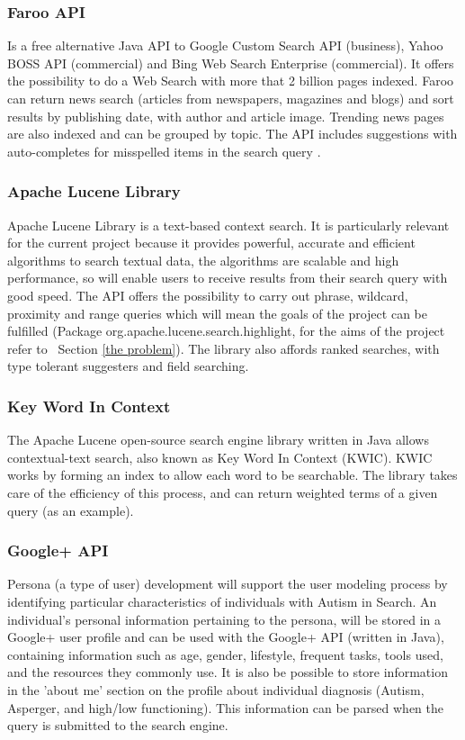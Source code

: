 \documentclass[10pt]{article}
\begin{document}
\subsubsection{Faroo API}
Is a free alternative Java API to Google Custom Search API (business), Yahoo BOSS API  (commercial) and Bing Web Search Enterprise (commercial). It offers the possibility to do a Web Search with more that 2 billion pages indexed. Faroo can return news search (articles from newspapers, magazines and blogs) and sort results by publishing date, with author and article image. Trending news pages are also indexed and can be grouped by topic. The API includes suggestions with auto-completes for misspelled items in the search query \cite{faroo}.

\subsubsection{Apache Lucene Library}\label{apache}
Apache Lucene Library is a text-based context search. It is particularly relevant for the current project because it provides powerful, accurate and efficient algorithms to search textual data, the algorithms are scalable and high performance, so will enable users to receive results from their search query with good speed. The API offers the possibility to carry out phrase, wildcard, proximity and range queries which will mean the goals of the project can be fulfilled (Package org.apache.lucene.search.highlight, for the aims of the project refer to ~Section \ref{the problem}). The library also affords ranked searches, with type tolerant suggesters and field searching.

\subsubsection{Key Word In Context} \label{KWIC} 
The Apache Lucene open-source search engine library written in Java allows contextual-text search, also known as Key Word In Context (KWIC)\cite{kwic}. KWIC works by forming an index to allow each word to be searchable. The library takes care of the efficiency of this process, and can return weighted terms of a given query (as an example).


\subsubsection{Google+ API}
Persona (a type of user) development will support the user modeling process by identifying particular characteristics of individuals with Autism in Search. An individual’s personal information pertaining to the persona, will be stored in a Google+ user profile and can be used with the Google+ API (written in Java), containing information such as age, gender, lifestyle, frequent tasks, tools used, and the resources they commonly use. It is also be possible to store information in the 'about me' section on the profile about individual diagnosis (Autism, Asperger, and high/low functioning). This information can be parsed when the query is submitted to the search engine.
\end{document}
